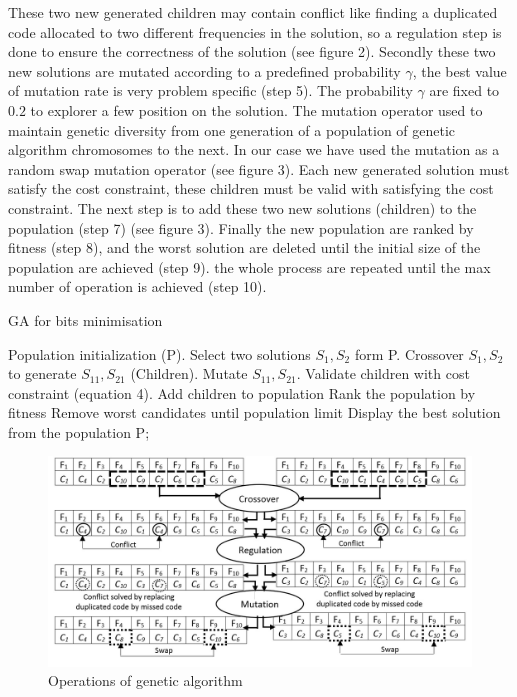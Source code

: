 \documentclass[preprint,12pt]{elsarticle}
\begin{document}
These two new generated children may contain conflict like finding a duplicated code allocated to two different frequencies in the solution, so a regulation step is done to ensure the correctness of the solution (see figure 2).
 Secondly these two new solutions are mutated according to a predefined probability $\gamma$, the best value of mutation rate is very problem specific (step 5). The probability $\gamma$ are fixed to $0.2$ to explorer a few position on the solution. The mutation operator used to maintain genetic diversity from one generation of a population of genetic algorithm chromosomes to the next. In our case we have used the mutation as a random swap mutation operator (see figure 3).  Each new generated solution must satisfy the cost constraint, these children must be valid with satisfying the cost constraint. The next step is to add these two new solutions (children) to the population (step 7) (see figure 3). Finally the new population are ranked by fitness (step 8), and the worst solution are deleted until the initial size of the population are achieved  (step 9). the whole process are repeated until the max number of operation is achieved (step 10). 
\begin{algorithm}
\caption{GA for bits minimisation}
\begin{algorithmic}[1]
\State Population initialization (P).
\REPEAT  
\State Select two solutions $S_{1},S_{2}$ form P.
\State Crossover $S_{1},S_{2}$ to generate $S_{11},S_{21}$ (Children).
\State Mutate $S_{11},S_{21}$.
\State Validate children with cost constraint (equation 4). 
\State Add children to population
\State Rank the population by fitness
\State Remove worst candidates until population limit
\EndWhile
\State Display the best solution from the population P;
\end{algorithmic}
\end{algorithm}

\begin{figure}[h]
\begin{center}
\includegraphics[scale=0.5]{Images/Drawing2.jpg}
\caption{Operations of genetic algorithm}
\end{center}
\label{Fig3}
\end{figure}
\end{document}

